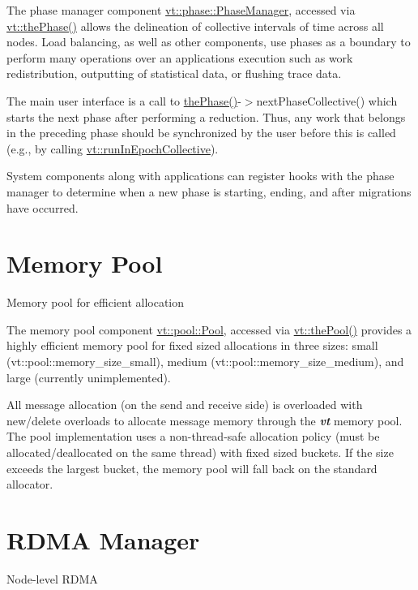 The phase manager component {\ttfamily \hyperlink{structvt_1_1phase_1_1_phase_manager}{vt\+::phase\+::\+Phase\+Manager}}, accessed via {\ttfamily \hyperlink{namespacevt_a3799d6b51fb71d7b6505760aad457e61}{vt\+::the\+Phase()}} allows the delineation of collective intervals of time across all nodes. Load balancing, as well as other components, use phases as a boundary to perform many operations over an application\textquotesingle{}s execution such as work redistribution, outputting of statistical data, or flushing trace data.

The main user interface is a call to {\ttfamily \hyperlink{namespacevt_a3799d6b51fb71d7b6505760aad457e61}{the\+Phase()}-\/$>$next\+Phase\+Collective()} which starts the next phase after performing a reduction. Thus, any work that belongs in the preceding phase should be synchronized by the user before this is called (e.\+g., by calling {\ttfamily \hyperlink{namespacevt_a2fc4ef34f30b49a1781d765804bfadbb}{vt\+::run\+In\+Epoch\+Collective}}).

System components along with applications can register hooks with the phase manager to determine when a new phase is starting, ending, and after migrations have occurred. \hypertarget{pool}{}\section{Memory Pool}\label{pool}
Memory pool for efficient allocation

The memory pool component {\ttfamily \hyperlink{structvt_1_1pool_1_1_pool}{vt\+::pool\+::\+Pool}}, accessed via {\ttfamily \hyperlink{namespacevt_aab3530d89a64e5ea903b0ccf303ecbb7}{vt\+::the\+Pool()}} provides a highly efficient memory pool for fixed sized allocations in three sizes\+: small ({\ttfamily vt\+::pool\+::memory\+\_\+size\+\_\+small}), medium ({\ttfamily vt\+::pool\+::memory\+\_\+size\+\_\+medium}), and large (currently unimplemented).

All message allocation (on the send and receive side) is overloaded with new/delete overloads to allocate message memory through the {\bfseries {\itshape vt}} memory pool. The pool implementation uses a non-\/thread-\/safe allocation policy (must be allocated/deallocated on the same thread) with fixed sized buckets. If the size exceeds the largest bucket, the memory pool will fall back on the standard allocator. \hypertarget{rdma}{}\section{R\+D\+MA Manager}\label{rdma}
Node-\/level R\+D\+MA

